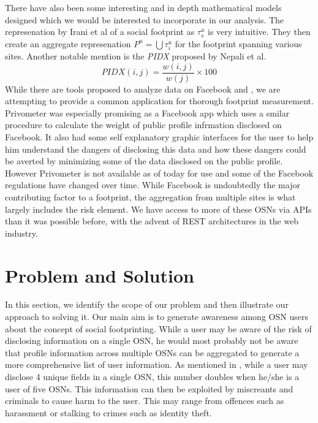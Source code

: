 \documentclass[10pt,conference]{IEEEtran}
\begin{document}
There have also been some interesting and in depth mathematical models designed which we would be interested to incorporate in our analysis. The represenation by Irani et al \cite{leakage} of a social footprint as \(\tau_{s}^{u}\) is very intuitive. They then create an aggregate represenation \(P^{u}=\bigcup\tau_{i}^{u}\) for the footprint spanning various sites. Another notable mention is the {\sl PIDX} proposed by Nepali et al. \cite{pidx}
\begin{equation}
PIDX(i,j) = \frac{w(i,j)}{w(j)}\times100
\end{equation}
While there are tools proposed to analyze data on Facebook \cite{privometer} and \cite{privaware}, we are attempting to provide a common application for thorough footprint measurement. Privometer was especially promising as a Facebook app which uses a smilar procedure to calculate the weight of public profile infrmation disclosed on Facebook. It also had some self explanatory graphic interfaces for the user to help him understand the dangers of disclosing this data and how these dangers could be averted by minimizing some of the data disclosed on the public profile. However Privometer is not available as of today for use and some of the Facebook regulations have changed over time. While Facebook is undoubtedly the major contributing factor to a footprint, the aggregation from multiple sites is what largely includes the risk element. We have access to more of these OSNs via APIs than it was possible before, with the advent of REST architectures in the web industry.

\section{Problem and Solution}
In this section, we identify the scope of our problem and then illustrate our approach to solving it. Our main aim is to generate awareness among OSN users about the concept of social footprinting. While a user may be aware of the risk of disclosing information on a single OSN, he would most probably not be aware that profile information across multiple OSNs can be aggregated to generate a more comprehensive list of user information. As mentioned in \cite{emergingthreat}, while a user may disclose 4 unique fields in a single OSN, this number doubles when he/she is a user of five OSNs. This information can then be exploited by miscreants and criminals to cause harm to the user. This may range from offences such as harassment or stalking to crimes such as identity theft. \\
\end{document}
